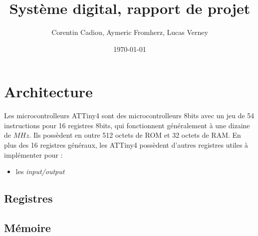 \documentclass[11pt]{article}
\author{Corentin Cadiou, Aymeric Fromherz, Lucas Verney}
\date{\today}
\title{Système digital, rapport de projet}
\begin{document}
\section{Architecture}
Les microcontrolleurs ATTiny4 sont des microcontrolleurs 8bits avec un
jeu de 54 instructions pour 16 registres 8bits, qui fonctionnent
généralement à une dizaine de $MHz$. Ils possèdent en outre 512 octets
de ROM et 32 octets de RAM. En plus des 16 registres généraux, les
ATTiny4 possèdent d'autres registres utiles à implémenter pour :
\begin{itemize}
  \item les \emph{input/output}
\end{itemize}
\subsection{Registres}

\subsection{Mémoire}

\end{document}
